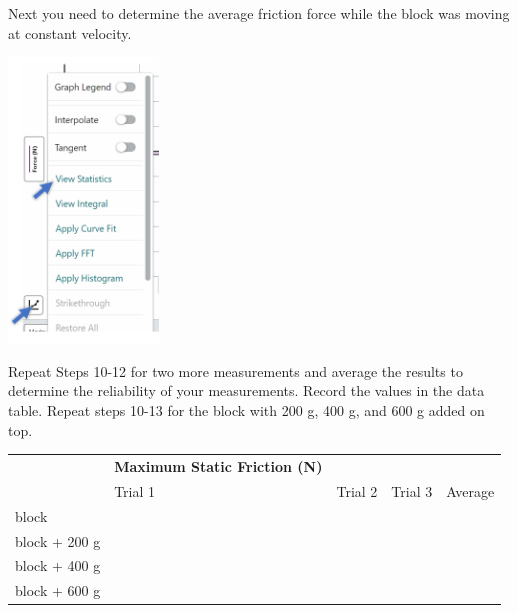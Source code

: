 \documentclass[10pt]{exam}
\begin{document}
\begin{questions}
\pagebreak

\question
  Next you need to determine the average friction force while the block was moving at constant velocity.

  \begin{multicols}{2}

    \includegraphics[width=4cm]{graph-tools}

  \end{multicols}

\question
  Repeat Steps 10-12 for two more measurements and average the results to determine the reliability of your measurements. Record the values in the data table. 
\question
  Repeat steps 10-13 for the block with 200 g, 400 g, and 600 g added on top.

  \begin{tabular}{|l
    *3{|>{\centering\arraybackslash}m{.15\textwidth}}
    ||>{\centering\arraybackslash}m{.15\textwidth}|}
    \hline
    & 
    {\bf Maximum Static Friction (N)}  \\
    & \center Trial 1 &
     \center Trial 2 & 
     \center Trial 3 &   Average 
     \\[0.5em]\hline\hline
    block &&&&\\[2em]\hline
    block + 200 g &&&&\\[2em]\hline
    block + 400 g &&&&\\[2em]\hline
    block + 600 g &&&&\\[2em]\hline
  \end{tabular}


\end{questions}
\end{document}
